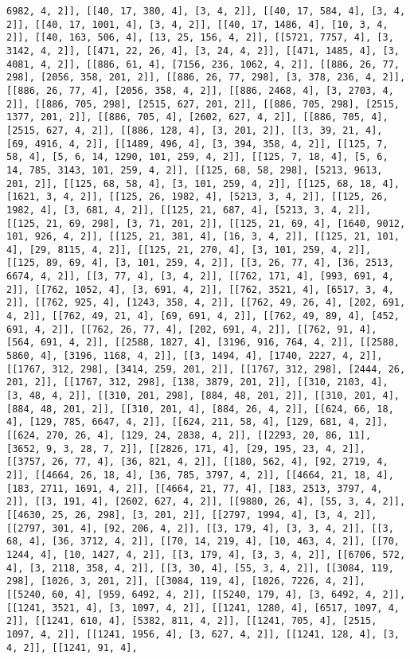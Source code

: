 \documentclass[12pt,fleqn]{article}\usepackage{../../common}
\begin{document}
\begin{verbatim}
6982, 4, 2]], [[40, 17, 380, 4], [3, 4, 2]], [[40, 17, 584, 4], [3, 4, 2]], [[40, 17, 1001, 4], [3, 4, 2]], [[40, 17, 1486, 4], [10, 3, 4, 2]], [[40, 163, 506, 4], [13, 25, 156, 4, 2]], [[5721, 7757, 4], [3, 3142, 4, 2]], [[471, 22, 26, 4], [3, 24, 4, 2]], [[471, 1485, 4], [3, 4081, 4, 2]], [[886, 61, 4], [7156, 236, 1062, 4, 2]], [[886, 26, 77, 298], [2056, 358, 201, 2]], [[886, 26, 77, 298], [3, 378, 236, 4, 2]], [[886, 26, 77, 4], [2056, 358, 4, 2]], [[886, 2468, 4], [3, 2703, 4, 2]], [[886, 705, 298], [2515, 627, 201, 2]], [[886, 705, 298], [2515, 1377, 201, 2]], [[886, 705, 4], [2602, 627, 4, 2]], [[886, 705, 4], [2515, 627, 4, 2]], [[886, 128, 4], [3, 201, 2]], [[3, 39, 21, 4], [69, 4916, 4, 2]], [[1489, 496, 4], [3, 394, 358, 4, 2]], [[125, 7, 58, 4], [5, 6, 14, 1290, 101, 259, 4, 2]], [[125, 7, 18, 4], [5, 6, 14, 785, 3143, 101, 259, 4, 2]], [[125, 68, 58, 298], [5213, 9613, 201, 2]], [[125, 68, 58, 4], [3, 101, 259, 4, 2]], [[125, 68, 18, 4], [1621, 3, 4, 2]], [[125, 26, 1982, 4], [5213, 3, 4, 2]], [[125, 26, 1982, 4], [3, 681, 4, 2]], [[125, 21, 687, 4], [5213, 3, 4, 2]], [[125, 21, 69, 298], [3, 71, 201, 2]], [[125, 21, 69, 4], [1640, 9012, 101, 926, 4, 2]], [[125, 21, 381, 4], [16, 3, 4, 2]], [[125, 21, 101, 4], [29, 8115, 4, 2]], [[125, 21, 270, 4], [3, 101, 259, 4, 2]], [[125, 89, 69, 4], [3, 101, 259, 4, 2]], [[3, 26, 77, 4], [36, 2513, 6674, 4, 2]], [[3, 77, 4], [3, 4, 2]], [[762, 171, 4], [993, 691, 4, 2]], [[762, 1052, 4], [3, 691, 4, 2]], [[762, 3521, 4], [6517, 3, 4, 2]], [[762, 925, 4], [1243, 358, 4, 2]], [[762, 49, 26, 4], [202, 691, 4, 2]], [[762, 49, 21, 4], [69, 691, 4, 2]], [[762, 49, 89, 4], [452, 691, 4, 2]], [[762, 26, 77, 4], [202, 691, 4, 2]], [[762, 91, 4], [564, 691, 4, 2]], [[2588, 1827, 4], [3196, 916, 764, 4, 2]], [[2588, 5860, 4], [3196, 1168, 4, 2]], [[3, 1494, 4], [1740, 2227, 4, 2]], [[1767, 312, 298], [3414, 259, 201, 2]], [[1767, 312, 298], [2444, 26, 201, 2]], [[1767, 312, 298], [138, 3879, 201, 2]], [[310, 2103, 4], [3, 48, 4, 2]], [[310, 201, 298], [884, 48, 201, 2]], [[310, 201, 4], [884, 48, 201, 2]], [[310, 201, 4], [884, 26, 4, 2]], [[624, 66, 18, 4], [129, 785, 6647, 4, 2]], [[624, 211, 58, 4], [129, 681, 4, 2]], [[624, 270, 26, 4], [129, 24, 2838, 4, 2]], [[2293, 20, 86, 11], [3652, 9, 3, 28, 7, 2]], [[2826, 171, 4], [29, 195, 23, 4, 2]], [[3757, 26, 77, 4], [36, 821, 4, 2]], [[180, 562, 4], [92, 2719, 4, 2]], [[4664, 26, 18, 4], [36, 785, 3797, 4, 2]], [[4664, 21, 18, 4], [183, 2711, 1691, 4, 2]], [[4664, 21, 77, 4], [183, 2513, 3797, 4, 2]], [[3, 191, 4], [2602, 627, 4, 2]], [[9880, 26, 4], [55, 3, 4, 2]], [[4630, 25, 26, 298], [3, 201, 2]], [[2797, 1994, 4], [3, 4, 2]], [[2797, 301, 4], [92, 206, 4, 2]], [[3, 179, 4], [3, 3, 4, 2]], [[3, 68, 4], [36, 3712, 4, 2]], [[70, 14, 219, 4], [10, 463, 4, 2]], [[70, 1244, 4], [10, 1427, 4, 2]], [[3, 179, 4], [3, 3, 4, 2]], [[6706, 572, 4], [3, 2118, 358, 4, 2]], [[3, 30, 4], [55, 3, 4, 2]], [[3084, 119, 298], [1026, 3, 201, 2]], [[3084, 119, 4], [1026, 7226, 4, 2]], [[5240, 60, 4], [959, 6492, 4, 2]], [[5240, 179, 4], [3, 6492, 4, 2]], [[1241, 3521, 4], [3, 1097, 4, 2]], [[1241, 1280, 4], [6517, 1097, 4, 2]], [[1241, 610, 4], [5382, 811, 4, 2]], [[1241, 705, 4], [2515, 1097, 4, 2]], [[1241, 1956, 4], [3, 627, 4, 2]], [[1241, 128, 4], [3, 4, 2]], [[1241, 91, 4], 
\end{verbatim}
\end{document}
